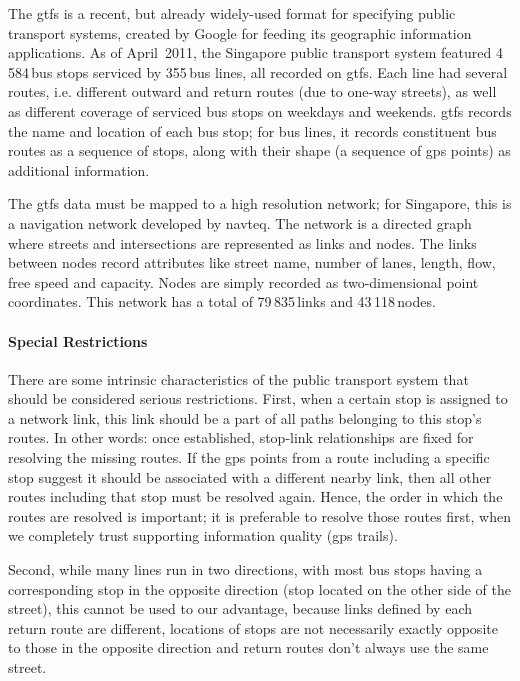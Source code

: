 The \gls{gtfs} is a recent, but already widely-used format for specifying public transport systems, created by Google for feeding its geographic information applications. As of April~2011, the Singapore public transport system featured 4\,584\,bus stops serviced by 355\,bus lines, all recorded on \gls{gtfs}. Each line had several routes, i.e. different outward and return routes (due to one-way streets), as well as different coverage of serviced bus stops on weekdays and weekends. \gls{gtfs} records the name and location of each bus stop; for bus lines, it records constituent bus routes as a sequence of stops, along with their shape (a sequence of \gls{gps} points) as additional information. 

The \gls{gtfs} data must be mapped to a high resolution network; for Singapore, this is a navigation network developed by \gls{navteq}. The network is a directed graph where streets and intersections are represented as links and nodes. The links between nodes record attributes like street name, number of lanes, length, flow, free speed and capacity. Nodes are simply recorded as two-dimensional point coordinates. This network has a total of 79\,835\,links and 43\,118\,nodes.

\paragraph{Special Restrictions}

There are some intrinsic characteristics of the public transport system that should be considered serious restrictions. First, when a certain stop is assigned to a network link, this link should be a part of all paths belonging to this stop's routes. In other words: once established, stop-link relationships are fixed for resolving the missing routes. If the \gls{gps} points from a route including a specific stop suggest it should be associated with a different nearby link, then all other routes including that stop must be resolved again. Hence, the order in which the routes are resolved is important; it is preferable to resolve those routes first, when we completely trust supporting information quality (\eg \gls{gps} trails).

Second, while many lines run in two directions, with most bus stops having a corresponding stop in the opposite direction (stop located on the other side of the street), this cannot be used to our advantage, because links defined by each return route are different, locations of stops are not necessarily exactly opposite to those in the opposite direction and return routes  don't always use the same street.

